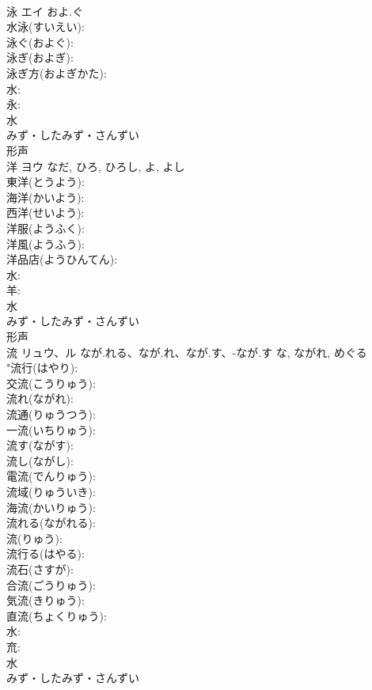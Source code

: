 \documentclass[8pt]{extreport}
\begin{document}
\begin{CJK}{UTF8}{min}
\\	泳	エイ	およ.ぐ		
\\	水泳(すいえい): 
\\	泳ぐ(およぐ): 
\\	泳ぎ(およぎ): 
\\	泳ぎ方(およぎかた): 
\\	水: 
\\	永: 
\\	水	
\\	みず・したみず・さんずい	
\\	形声 
\\	洋	ヨウ		なだ, ひろ, ひろし, よ, よし	
\\	東洋(とうよう): 
\\	海洋(かいよう): 
\\	西洋(せいよう): 
\\	洋服(ようふく): 
\\	洋風(ようふう): 
\\	洋品店(ようひんてん): 
\\	水: 
\\	羊: 
\\	水	
\\	みず・したみず・さんずい	
\\	形声 
\\	流	リュウ、ル	なが.れる、なが.れ、なが.す、-なが.す	な, ながれ, めぐる	
\\	"流行(はやり): 
\\	交流(こうりゅう): 
\\	流れ(ながれ): 
\\	流通(りゅうつう): 
\\	一流(いちりゅう): 
\\	流す(ながす): 
\\	流し(ながし): 
\\	電流(でんりゅう): 
\\	流域(りゅういき): 
\\	海流(かいりゅう): 
\\	流れる(ながれる): 
\\	流(りゅう): 
\\	流行る(はやる): 
\\	流石(さすが): 
\\	合流(ごうりゅう): 
\\	気流(きりゅう): 
\\	直流(ちょくりゅう): 
\\	水: 
\\	㐬: 
\\	水	
\\	みず・したみず・さんずい	

\end{CJK}
\end{document}
